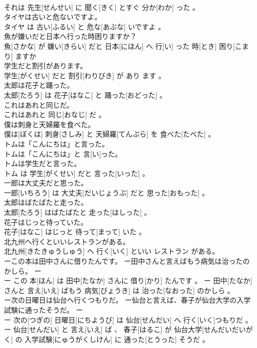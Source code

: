 \documentclass[8pt]{extreport}
\begin{document}
\begin{CJK}{UTF8}{min}
\\	それは 先生[せんせい] に 聞く[きく] とすぐ 分か[わか] った 。
\\	タイヤは古いと危ないですよ。	
\\	タイヤ は 古い[ふるい] と 危な[あぶな] いですよ 。
\\	魚が嫌いだと日本へ行った時困りますか？	
\\	魚[さかな] が 嫌い[きらい] だと 日本[にほん] へ 行[い] った 時[とき] 困り[こまり] ますか 
\\	学生だと割引があります。	
\\	学生[がくせい] だと 割引[わりびき] が あり ます 。
\\	太郎は花子と踊った。	
\\	太郎[たろう] は 花子[はなこ] と 踊った[おどった] 。
\\	これはあれと同じだ。	
\\	これはあれと 同じ[おなじ] だ 。
\\	僕は刺身と天婦羅を食べた。	
\\	僕は[ぼくは] 刺身[さしみ] と 天婦羅[てんぷら] を 食べた[たべた] 。
\\	トムは「こんにちは」と言った。	
\\	トムは「こんにちは」と 言[い]った。
\\	トムは学生だと言った。	
\\	トム は 学生[がくせい] だと 言った[いった] 。
\\	一郎は大丈夫だと思った。	
\\	一郎[いちろう] は 大丈夫[だいじょうぶ] だと 思った[おもった] 。
\\	太郎はばたばたと走った。	
\\	太郎[たろう] はばたばたと 走った[はしった] 。
\\	花子はじっと待っていた。	
\\	花子[はなこ] はじっと 待って[まって] いた 。
\\	北九州へ行くといいレストランがある。	
\\	北九州[きたきゅうしゅう] へ 行く[いく] といい レストラン がある。
\\	ーこの本は田中さんに借りたんです。 ー田中さんと言えばもう病気は治ったのかしら。	ー
\\	ー この 本[ほん] は 田中[たなか] さんに 借り[かり] たんです 。 ー 田中[たなか] さんと 言え[いえ] ばもう 病気[びょうき] は 治った[なおった] のかしら 。
\\	ー次の日曜日は仙台へ行くつもりだ。 ー仙台と言えば、春子が仙台大学の入学試験に通ったそうだ。	ー
\\	ー 次の[つぎの] 日曜日[にちようび] は 仙台[せんだい] へ 行く[いく]つもりだ 。 ー 仙台[せんだい] と 言え[いえ] ば 、 春子[はるこ] が 仙台大学[せんだいだいがく] の 入学試験[にゅうがくしけん] に 通った[とうった] そうだ 。

\end{CJK}
\end{document}
